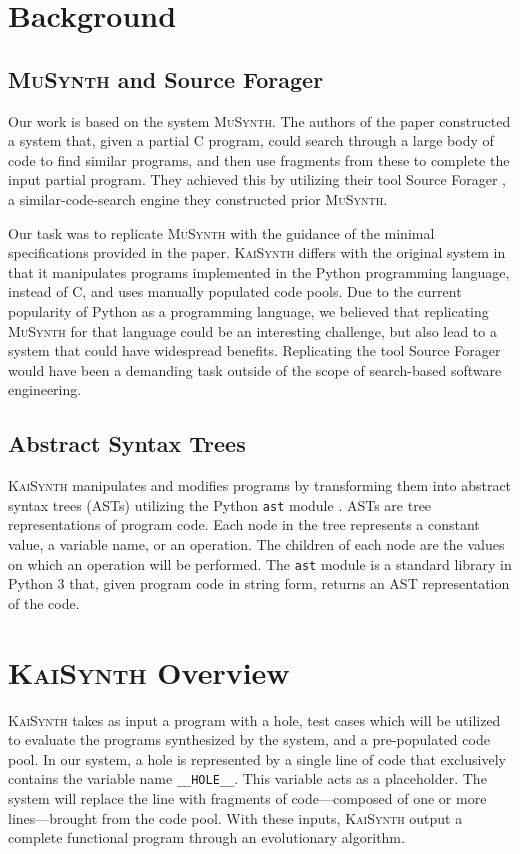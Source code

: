 \documentclass{article}
\begin{document}
\section{Background}
\subsection{\textsc{MuSynth} and Source Forager}
Our work is based on the system \textsc{MuSynth}. The authors of the paper constructed a system that, given a partial C program, could search through a large body of code to find similar programs, and then use fragments from these to complete the input partial program. They achieved this by utilizing their tool Source Forager \cite{sourceforager}, a similar-code-search engine they constructed prior \textsc{MuSynth}.

Our task was to replicate \textsc{MuSynth} with the guidance of the minimal specifications provided in the paper. \textsc{KaiSynth} differs with the original system in that it manipulates programs implemented in the Python programming language, instead of C, and uses manually populated code pools. Due to the current popularity of Python as a programming language, we believed that replicating \textsc{MuSynth} for that language could be an interesting challenge, but also lead to a system that could have widespread benefits. Replicating the tool Source Forager would have been a demanding task outside of the scope of search-based software engineering.

\subsection{Abstract Syntax Trees}
\textsc{KaiSynth} manipulates and modifies programs by transforming them into abstract syntax trees (ASTs) utilizing the Python \texttt{ast} module \cite{astpython}. ASTs are tree representations of program code. Each node in the tree represents a constant value, a variable name, or an operation. The children of each node are the values on which an operation will be performed.  The \texttt{ast} module is a standard library in Python 3 that, given program code in string form, returns an AST representation of the code.


\section{\textsc{KaiSynth} Overview}

\textsc{KaiSynth} takes as input a program with a hole, test cases which will be utilized to evaluate the programs synthesized by the system, and a pre-populated code pool. In our system, a hole is represented by a single line of code that exclusively contains the variable name \texttt{\_\_HOLE\_\_}. This variable acts as a placeholder. The system will replace the line with fragments of code---composed of one or more lines---brought from the code pool. With these inputs, \textsc{KaiSynth} output a complete functional program through an evolutionary algorithm.
\end{document}

